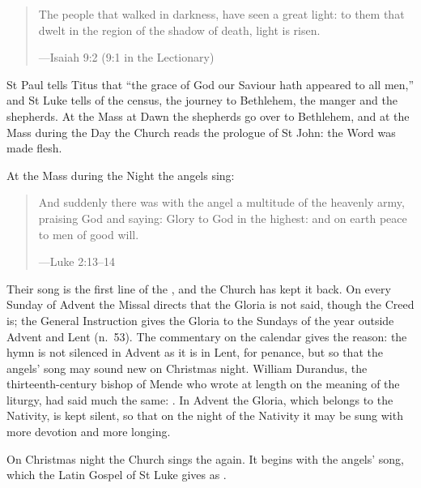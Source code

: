\begin{quote}
The people that walked in darkness, have seen a great light: to them that dwelt
in the region of the shadow of death, light is risen.\par
{\smallskip\noindent\small ---Isaiah 9:2 (9:1 in the Lectionary)\par}
\end{quote}

\noindent St Paul tells Titus that ``the grace of God our Saviour hath appeared
to all men,'' and St Luke tells of the census, the journey to Bethlehem, the
manger and the shepherds. At the Mass at Dawn the shepherds go over to
Bethlehem, and at the Mass during the Day the Church reads the prologue of St
John: the Word was made flesh.

At the Mass during the Night the angels sing:

\begin{quote}
And suddenly there was with the angel a multitude of the heavenly army, praising
God and saying: Glory to God in the highest: and on earth peace to men of good
will.\par
{\smallskip\noindent\small ---Luke 2:13--14\par}
\end{quote}

\noindent Their song is the first line of the , and the
Church has kept it back. On every Sunday of Advent the Missal directs that the
Gloria is not said, though the Creed is; the General Instruction gives the
Gloria to the Sundays of the year outside Advent and Lent (n.~53). The
commentary on the calendar gives the reason: the hymn
is not silenced in Advent as it is in Lent, for penance, but so that the
angels' song may sound new on Christmas night. William Durandus, the
thirteenth-century bishop of Mende who wrote at length on the meaning of the
liturgy, had said much the same:
. In Advent
the Gloria, which belongs to the Nativity, is kept silent, so that on the night
of the Nativity it may be sung with more devotion and more longing.

On Christmas night the Church sings the  again. It
begins with the angels' song, which the Latin Gospel of St Luke gives as
.
